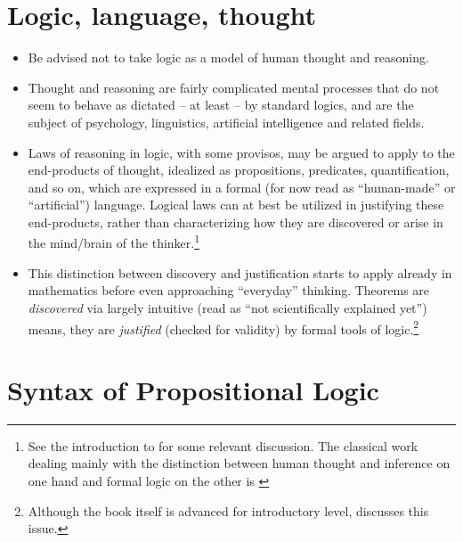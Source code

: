 \documentclass[11pt]{article}
\begin{document}
\tableofcontents
\newpage
\section{Logic, language, thought}
\begin{itemize}
\item Be advised not to take logic as a model of human thought and reasoning.
\item Thought and reasoning are fairly complicated mental processes that do not
seem to behave as dictated -- at least -- by standard logics, and are the
subject of psychology, linguistics, artificial intelligence and
related fields. 

\item Laws of reasoning in logic, with some provisos, may be argued to apply to the end-products of thought,
idealized as propositions, predicates, quantification, and so on, which are
expressed in a formal (for now read as ``human-made'' or ``artificial'') language.
Logical laws can at best be utilized in justifying these end-products, rather
than characterizing how they are discovered or arise in the mind/brain of the
thinker.\footnote{See the introduction to \cite{reichenbach47} for some relevant
discussion. The classical work dealing mainly with the distinction between
human thought and inference on one hand and formal logic on the other is
\cite{johnsonlaird83}}
\item This distinction between discovery and justification starts to apply
already in mathematics before even approaching 	``everyday'' thinking. Theorems are
\textit{discovered} via largely intuitive (read as ``not scientifically explained
yet'') means, they are \textit{justified} (checked for validity) by formal tools
of logic.\footnote{Although the book itself is advanced for introductory level,
\cite[\S 16]{quine40} discusses this issue.}

\end{itemize}


\section{Syntax of Propositional Logic}
\label{induc}
\end{document}
